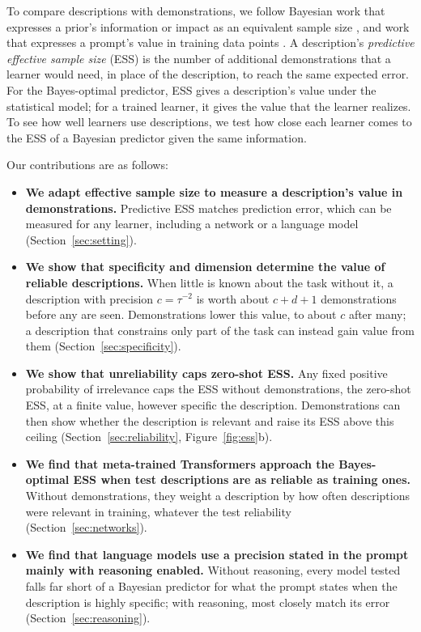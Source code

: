 \documentclass{article}
\theoremstyle{definition}
\begin{document}
To compare descriptions with demonstrations, we follow Bayesian work that expresses a prior's information or impact as an equivalent sample size \citep{wiesenfarth2020,reimherr2021,selby2025}, and work that expresses a prompt's value in training data points \citep{lescao2021}. A description's \emph{predictive effective sample size} (ESS) is the number of additional demonstrations that a learner would need, in place of the description, to reach the same expected error. For the Bayes-optimal predictor, ESS gives a description's value under the statistical model; for a trained learner, it gives the value that the learner realizes. To see how well learners use descriptions, we test how close each learner comes to the ESS of a Bayesian predictor given the same information.

Our contributions are as follows:
\begin{itemize}[leftmargin=*,itemsep=2pt,topsep=3pt]
\item \textbf{We adapt effective sample size to measure a description's value in demonstrations.} Predictive ESS matches prediction error, which can be measured for any learner, including a network or a language model (Section~\ref{sec:setting}).
\item \textbf{We show that specificity and dimension determine the value of reliable descriptions.} When little is known about the task without it, a description with precision $c=\tau^{-2}$ is worth about $c+d+1$ demonstrations before any are seen. Demonstrations lower this value, to about $c$ after many; a description that constrains only part of the task can instead gain value from them (Section~\ref{sec:specificity}).
\item \textbf{We show that unreliability caps zero-shot ESS.} Any fixed positive probability of irrelevance caps the ESS without demonstrations, the zero-shot ESS, at a finite value, however specific the description. Demonstrations can then show whether the description is relevant and raise its ESS above this ceiling (Section~\ref{sec:reliability}, Figure~\ref{fig:ess}b).
\item \textbf{We find that meta-trained Transformers approach the Bayes-optimal ESS when test descriptions are as reliable as training ones.} Without demonstrations, they weight a description by how often descriptions were relevant in training, whatever the test reliability (Section~\ref{sec:networks}).
\item \textbf{We find that language models use a precision stated in the prompt mainly with reasoning enabled.} Without reasoning, every model tested falls far short of a Bayesian predictor for what the prompt states when the description is highly specific; with reasoning, most closely match its error (Section~\ref{sec:reasoning}).
\end{itemize}
\end{document}
